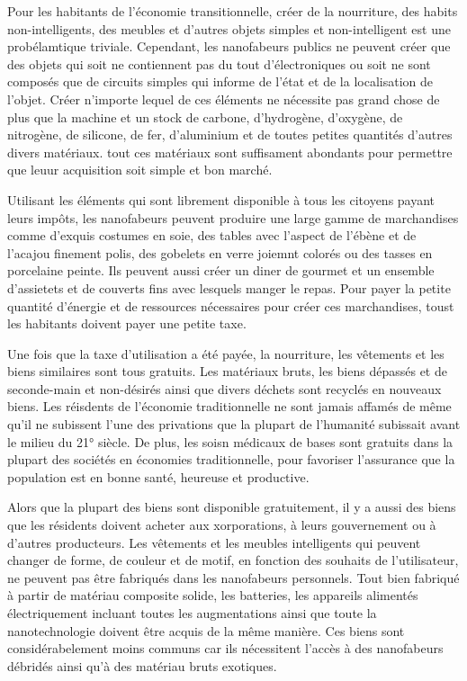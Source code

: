                Pour les habitants de l'économie transitionnelle, créer de la nourriture, des habits non-intelligents, des meubles et d'autres objets simples et non-intelligent est une probélamtique triviale. Cependant, les nanofabeurs publics ne peuvent créer que des objets qui soit ne contiennent pas du tout d'électroniques ou soit ne sont composés que de circuits simples qui informe de l'état et de la localisation de l'objet. Créer n'importe lequel de ces éléments ne nécessite pas grand chose de plus que la machine et un stock de carbone, d'hydrogène, d'oxygène, de nitrogène, de silicone, de fer, d'aluminium et de toutes petites quantités d'autres divers matériaux. tout ces matériaux sont suffisament abondants pour permettre que leuur acquisition soit simple et bon marché. 

               Utilisant les éléments qui sont librement disponible à tous les citoyens payant leurs impôts, les nanofabeurs peuvent produire une large gamme de marchandises comme d'exquis costumes en soie, des tables avec l'aspect de l'ébène et de l'acajou finement polis, des gobelets en  verre joiemnt colorés ou des tasses en porcelaine peinte. Ils peuvent aussi créer un diner de gourmet et un ensemble d'assietets et de couverts fins avec lesquels manger le repas. Pour payer la petite quantité d'énergie et de ressources nécessaires pour créer ces marchandises, toust les habitants doivent payer une petite taxe. 

               Une fois que la taxe d'utilisation a été payée, la nourriture, les vêtements et les biens similaires sont tous gratuits. Les matériaux bruts, les biens dépassés et de seconde-main et non-désirés ainsi que divers déchets sont recyclés en nouveaux biens. Les réisdents de l'économie traditionnelle ne sont jamais affamés de même qu'il ne subissent l'une des privations que la plupart de l'humanité subissait avant le milieu du 21° siècle. De plus, les soisn médicaux de bases sont gratuits dans la plupart des sociétés en économies traditionnelle, pour favoriser l'assurance que la population est en bonne santé, heureuse et productive. 

               Alors que la plupart des biens sont disponible gratuitement, il y a aussi des biens que les résidents doivent acheter aux xorporations, à leurs gouvernement ou à d'autres producteurs. Les vêtements et les meubles intelligents qui peuvent changer de forme, de couleur et de motif, en fonction des souhaits de l'utilisateur, ne peuvent pas être fabriqués dans les nanofabeurs personnels. Tout bien fabriqué à partir de matériau composite solide, les batteries, les appareils alimentés électriquement incluant toutes les augmentations ainsi que toute la nanotechnologie doivent être acquis de la même manière. Ces biens sont considérabelement moins communs car ils nécessitent l'accès à des nanofabeurs débridés ainsi qu'à des matériau bruts exotiques. 

